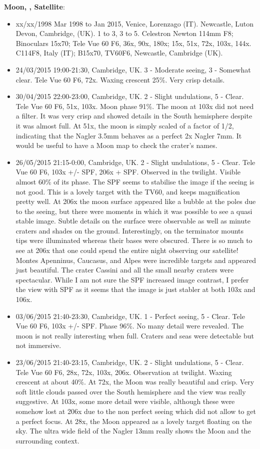 {\bf Moon, , Satellite}:
\begin{itemize}
\item xx/xx/1998 Mar 1998 to Jan 2015, Venice, Lorenzago (IT). Newcastle, Luton Devon, Cambridge, (UK). 1 to 3, 3 to 5. Celestron Newton 114mm F8; Binoculars 15x70; Tele Vue 60 F6, 36x, 90x, 180x; 15x, 51x, 72x, 103x, 144x. C114F8, Italy (IT); B15x70, TV60F6, Newcastle, Cambridge (UK).
\item 24/03/2015 19:00-21:30, Cambridge, UK. 3 - Moderate seeing, 3 - Somewhat clear. Tele Vue 60 F6, 72x. Waxing crescent 25\%. Very crisp details. 
\item 30/04/2015 22:00-23:00, Cambridge, UK. 2 - Slight undulations, 5 - Clear. Tele Vue 60 F6, 51x, 103x. Moon phase 91\%. The moon at 103x did not need a filter. It was very crisp and showed details in the South hemisphere despite it was almost full. At 51x, the moon is simply scaled of a factor of 1/2, indicating that the Nagler 3.5mm behaves as a perfect 2x Nagler 7mm. It would be useful to have a Moon map to check the crater's names. 
\item 26/05/2015 21:15-0:00, Cambridge, UK. 2 - Slight undulations, 5 - Clear. Tele Vue 60 F6, 103x +/- SPF, 206x + SPF. Observed in the twilight. Visible almost 60\% of its phase. The SPF seems to stabilise the image if the seeing is not good. This is a lovely target with the TV60, and keeps magnification pretty well. At 206x the moon surface appeared like a bubble at the poles due to the seeing, but there were moments in which it was possible to see a quasi stable image. Subtle details on the surface were observable as well as minute craters and shades on the ground. Interestingly, on the terminator mounts tips were illuminated whereas their bases were obscured. There is so much to see at 206x that one could spend the entire night observing our satellite! Montes Apenninus, Caucasus, and Alpes were incredible targets and appeared just beautiful. The crater Cassini and all the small nearby craters were spectacular. While I am not sure the SPF increased image contrast, I prefer the view with SPF as it seems that the image is just stabler at both 103x and 106x.
\item 03/06/2015 21:40-23:30, Cambridge, UK. 1 - Perfect seeing, 5 - Clear. Tele Vue 60 F6, 103x +/- SPF. Phase 96\%. No many detail were revealed. The moon is not really interesting when full. Craters and seas were detectable but not immersive. 
\item 23/06/2015 21:40-23:15, Cambridge, UK. 2 - Slight undulations, 5 - Clear. Tele Vue 60 F6, 28x, 72x, 103x, 206x. Observation at twilight. Waxing crescent at about 40\%. At 72x, the Moon was really beautiful and crisp. Very soft little clouds passed over the South hemisphere and the view was really suggestive. At 103x, some more detail were visible, although these were somehow lost at 206x due to the non perfect seeing which did not allow to get a perfect focus. At 28x, the Moon appeared as a lovely target floating on the sky. The ultra wide field of the Nagler 13mm really shows the Moon and the surrounding context.

\end{itemize}
